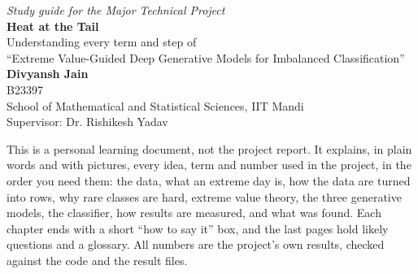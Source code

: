 \documentclass[12pt,a4paper]{report}
\begin{document}
\thispagestyle{empty}
\begin{center}
{\large\em Study guide for the Major Technical Project}\\[4ex]
{\LARGE\bf Heat at the Tail}\\[2ex]
{\Large Understanding every term and step of\\ ``Extreme Value-Guided Deep Generative Models for Imbalanced Classification''}\\[5ex]
{\large\bf Divyansh Jain}\\[1ex]
{\large B23397}\\[1ex]
{\large School of Mathematical and Statistical Sciences, IIT Mandi}\\[1ex]
{\large Supervisor: Dr. Rishikesh Yadav}\\[6ex]
\end{center}

\begin{keyidea}
This is a personal learning document, not the project report. It explains, in plain words and with pictures, every
idea, term and number used in the project, in the order you need them: the data, what an extreme day is, how the data
are turned into rows, why rare classes are hard, extreme value theory, the three generative models, the classifier, how
results are measured, and what was found. Each chapter ends with a short ``how to say it'' box, and the last pages hold
likely questions and a glossary. All numbers are the project's own results, checked against the code and the result
files.
\end{keyidea}

\vfill
\begin{center}
\end{center}
\vfill

\tableofcontents
\clearpage














\end{document}
